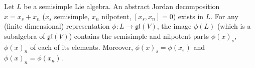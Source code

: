 Let $L$ be a semisimple Lie algebra. An abstract Jordan decomposition $x = x_s + x_n$ ($x_s$ semisimple, $x_n$ nilpotent, $[x_s, x_n] = 0$) exists in $L$. For any (finite dimensional) representation $\phi: L \rightarrow \mathfrak{gl}(V)$, the image $\phi(L)$ (which is a subalgebra of $\mathfrak{gl}(V)$) contains the semisimple and nilpotent parts $\phi(x)_s$, $\phi(x)_n$ of each of its elements. Moreover, $\phi(x)_s = \phi(x_s)$ and $\phi(x)_n = \phi(x_n)$.
